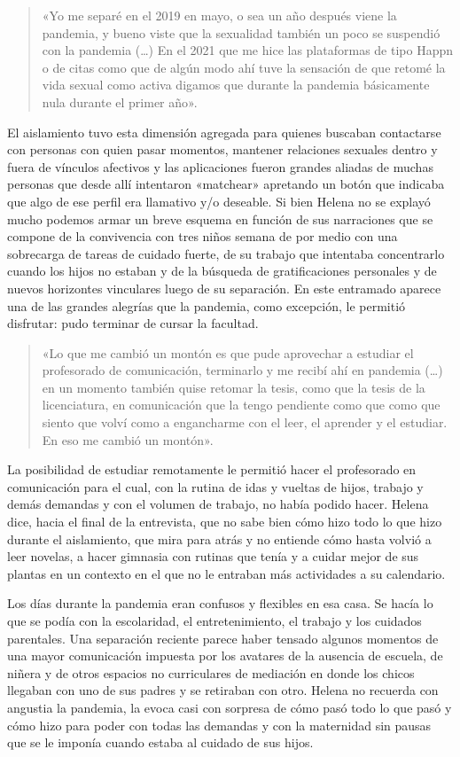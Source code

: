 \begin{quote}
«Yo me separé en el 2019 en mayo, o sea un año después viene la pandemia, y bueno viste que la sexualidad también un poco se suspendió con la pandemia (\ldots) En el 2021 que me hice las plataformas de tipo Happn o de citas como que de algún modo ahí tuve la sensación de que retomé la vida sexual como activa digamos que durante la pandemia básicamente nula durante el primer año».
\end{quote}

El aislamiento tuvo esta dimensión agregada para quienes buscaban contactarse con personas con quien pasar momentos, mantener relaciones sexuales dentro y fuera de vínculos afectivos y las aplicaciones fueron grandes aliadas de muchas personas que desde allí intentaron «matchear» apretando un botón que indicaba que algo de ese perfil era llamativo y/o deseable. Si bien Helena no se explayó mucho podemos armar un breve esquema en función de sus narraciones que se compone de la convivencia con tres niños semana de por medio con una sobrecarga de tareas de cuidado fuerte, de su trabajo que intentaba concentrarlo cuando los hijos no estaban y de la búsqueda de gratificaciones personales y de nuevos horizontes vinculares luego de su separación. En este entramado aparece una de las grandes alegrías que la pandemia, como excepción, le permitió disfrutar: pudo terminar de cursar la facultad.

\begin{quote}
«Lo que me cambió un montón es que pude aprovechar a estudiar el profesorado de comunicación, terminarlo y me recibí ahí en pandemia (\ldots) en un momento también quise retomar la tesis, como que la tesis de la licenciatura, en comunicación que la tengo pendiente como que como que siento que volví como a engancharme con el leer, el aprender y el estudiar. En eso me cambió un montón».
\end{quote}

La posibilidad de estudiar remotamente le permitió hacer el profesorado en comunicación para el cual, con la rutina de idas y vueltas de hijos, trabajo y demás demandas y con el volumen de trabajo, no había podido hacer. Helena dice, hacia el final de la entrevista, que no sabe bien cómo hizo todo lo que hizo durante el aislamiento, que mira para atrás y no entiende cómo hasta volvió a leer novelas, a hacer gimnasia con rutinas que tenía y a cuidar mejor de sus plantas en un contexto en el que no le entraban más actividades a su calendario.

Los días durante la pandemia eran confusos y flexibles en esa casa. Se hacía lo que se podía con la escolaridad, el entretenimiento, el trabajo y los cuidados parentales. Una separación reciente parece haber tensado algunos momentos de una mayor comunicación impuesta por los avatares de la ausencia de escuela, de niñera y de otros espacios no curriculares de mediación en donde los chicos llegaban con uno de sus padres y se retiraban con otro. Helena no recuerda con angustia la pandemia, la evoca casi con sorpresa de cómo pasó todo lo que pasó y cómo hizo para poder con todas las demandas y con la maternidad sin pausas que se le imponía cuando estaba al cuidado de sus hijos.

